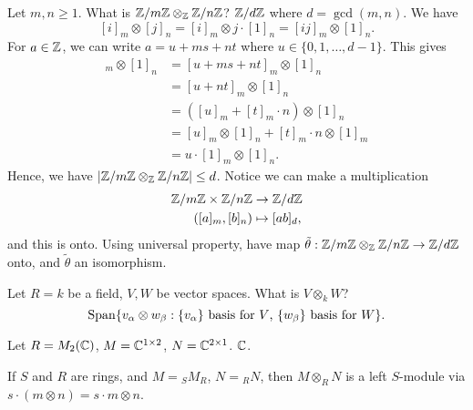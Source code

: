 \begin{exmp}{}
    Let $m, n \geq 1$. What is $\mathbb{Z}/m\mathbb{Z} \otimes_{\mathbb{Z}} \mathbb{Z}/n\mathbb{Z}$? 
    $\mathbb{Z}/d\mathbb{Z}$ where $d = \gcd(m, n)$. We have 
    \[ [i]_m \otimes [j]_n = [i]_m \otimes j \cdot [1]_n 
    = [ij]_m \otimes [1]_n. \] 
    For $a \in \mathbb{Z}$, we can write $a = u + ms + nt$ where 
    $u \in \{0, 1, \dots, d-1\}$. This gives 
    \begin{align*} 
        [ij]_m \otimes [1]_n 
        &= [u + ms + nt]_m \otimes [1]_n \\
        &= [u + nt]_m \otimes [1]_n \\
        &= ([u]_m + [t]_m \cdot n) \otimes [1]_n \\
        &= [u]_m \otimes [1]_n + [t]_m \cdot n \otimes [1]_m \\
        &= u \cdot [1]_m \otimes [1]_n. 
    \end{align*}
    Hence, we have $|\mathbb{Z}/m\mathbb{Z} \otimes_{\mathbb{Z}} \mathbb{Z}/n\mathbb{Z}| \leq d$. 
    Notice we can make a multiplication
    \begin{align*}
        \mathbb{Z}/m\mathbb{Z} \times \mathbb{Z}/n\mathbb{Z} &\to \mathbb{Z}/d\mathbb{Z} \\ 
        ([a]_m, [b]_n) &\mapsto [ab]_d, 
    \end{align*}
    and this is onto. Using universal property, have 
    map $\tilde\theta : \mathbb{Z}/m\mathbb{Z} \otimes_{\mathbb{Z}} \mathbb{Z}/n\mathbb{Z} \to \mathbb{Z}/d\mathbb{Z}$ 
    onto, and $\tilde\theta$ an isomorphism. 
\end{exmp}

\begin{exmp}{}
    Let $R = k$ be a field, $V, W$ be vector spaces. What is 
    $V \otimes_k W$? 
    \[ {\rm Span}\{v_\alpha \otimes w_\beta : \{v_\alpha\} 
    \text{ basis for $V$, $\{w_\beta\}$ basis for $W$}\}. \] 
\end{exmp}

\begin{exmp}{}
    Let $R = M_2(\mathbb{C})$, $M = \mathbb{C}^{1\times2}$, $N = \mathbb{C}^{2\times1}$. 
    $\mathbb{C}$. 
\end{exmp}

\begin{remark}{}
    If $S$ and $R$ are rings, and $M = {}_S M_R$, $N = {}_R N$, then 
    $M \otimes_R N$ is a left $S$-module via 
    $s \cdot (m \otimes n) = s \cdot m \otimes n$. 
\end{remark}